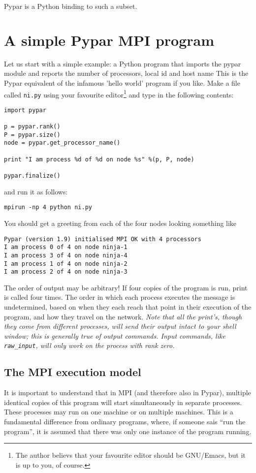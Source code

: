 \documentclass[12pt]{article}
\begin{document}
Pypar is a Python binding to such a subset.


\section{A simple Pypar MPI program}
Let us start with a simple example: a Python program
that imports the pypar module and
reports the number of processors, local id and host name
This is the Pypar equivalent of the infamous 'hello world'
program if you like.
Make a file called \texttt{ni.py} using your favourite
editor\footnote{The author believs that your favourite editor should
be GNU/Emacs, but it is up to you, of course.}
and type in the following contents:
{\footnotesize
\begin{verbatim}
import pypar

p = pypar.rank()
P = pypar.size()
node = pypar.get_processor_name()

print "I am process %d of %d on node %s" %(p, P, node)

pypar.finalize()
\end{verbatim}}
\noindent and run it as follows:
\begin{verbatim}
mpirun -np 4 python ni.py
\end{verbatim}
You should get a greeting from each of the four nodes looking
something like
\begin{verbatim}
Pypar (version 1.9) initialised MPI OK with 4 processors
I am process 0 of 4 on node ninja-1
I am process 3 of 4 on node ninja-4
I am process 1 of 4 on node ninja-2
I am process 2 of 4 on node ninja-3
\end{verbatim}
The order of output may be arbitrary!  If four copies of the
program is run, print is called four times. The order in which each
process executes the message is undetermined, based on when they each
reach that point in their execution of the program, and how they
travel on the network.
\emph{Note that all the print's, though they come from different
  processes, will send their output intact to your shell window; this
  is generally true of output commands.
  Input commands, like \texttt{raw_input},
  will only work on the process with rank zero.}


\subsection{The MPI execution model}

It is important to understand that in MPI (and therefore also in
Pypar), multiple identical copies of this program
will start simultaneously in separate processes.
These processes may run on one machine or on multiple machines.
This is a fundamental difference from ordinary programs,
where, if someone sais ``run the program'', it is
assumed that there was only one instance of the program running.
\end{document}
